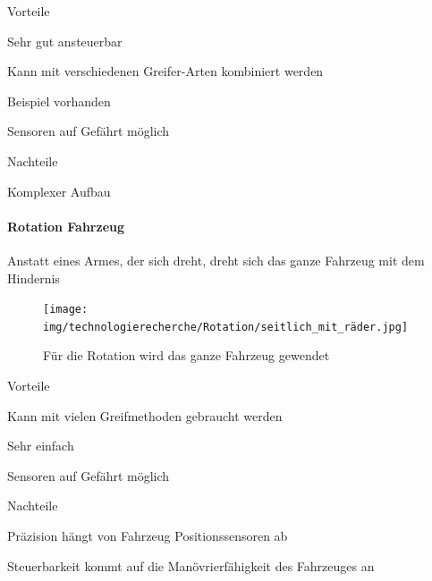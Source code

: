 \documentclass[../main.tex]{subfiles}
\begin{document}
\begin{minipage}[t]{0.48\textwidth}
    \begin{items}
          \item [Vorteile]
          \item Sehr gut ansteuerbar
          \item Kann mit verschiedenen Greifer-Arten kombiniert werden
          \item Beispiel vorhanden
          \item Sensoren auf Gefährt möglich
    \end{items}
\end{minipage}
\hfill
\begin{minipage}[t]{0.48\textwidth}
    \begin{items}
          \item [Nachteile]
          \item Komplexer Aufbau
    \end{items}
\end{minipage}
\newpage
\paragraph{Rotation Fahrzeug}
Anstatt eines Armes, der sich dreht, dreht sich das ganze Fahrzeug mit dem Hindernis

\begin{figure}[h!]
        \centering
        \texttt{[image: img/technologierecherche/Rotation/seitlich\_mit\_räder.jpg]}
        \caption{Für die Rotation wird das ganze Fahrzeug gewendet}
        \label{img:tech_seitlich_mit_räder}
\end{figure}

\begin{minipage}[t]{0.48\textwidth}
    \begin{items}
          \item [Vorteile]
          \item Kann mit vielen Greifmethoden gebraucht werden
          \item Sehr einfach
          \item Sensoren auf Gefährt möglich
    \end{items}
\end{minipage}
\hfill
\begin{minipage}[t]{0.48\textwidth}
    \begin{items}
          \item [Nachteile]
          \item Präzision hängt von Fahrzeug Positionssensoren ab
          \item Steuerbarkeit kommt auf die Manövrierfähigkeit des Fahrzeuges an 
    \end{items}
\end{minipage}
\newpage
\end{document}
